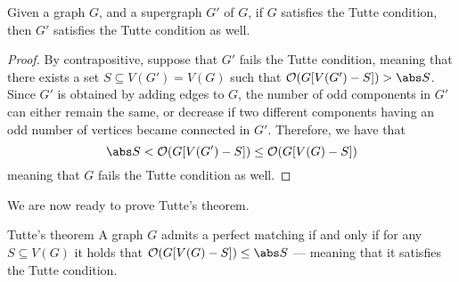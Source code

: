 \documentclass[a4paper, 12pt]{report}
\begin{document}
    \begin{framedlem}{}
        Given a graph $G$, and a supergraph $G'$ of $G$, if $G$ satisfies the Tutte condition, then $G'$ satisfies the Tutte condition as well.
    \end{framedlem}

    \begin{proof}
        By contrapositive, suppose that $G'$ fails the Tutte condition, meaning that there exists a set $S \subseteq V(G') = V(G)$ such that $\mathcal O (G[V(G') - S]) > \abs S$. Since $G'$ is obtained by adding edges to $G$, the number of odd components in $G'$ can either remain the same, or decrease if two different components having an odd number of vertices became connected in $G'$. Therefore, we have that $$\abs S < \mathcal O (G[V(G') - S]) \le \mathcal O (G[V(G) - S])$$ meaning that $G$ fails the Tutte condition as well.
    \end{proof}

    We are now ready to prove Tutte's theorem.

    \begin{framedthm}{Tutte's theorem}
        A graph $G$ admits a perfect matching if and only if for any $S \subseteq V(G)$ it holds that $\mathcal O(G[V(G) - S]) \le \abs S$ --- meaning that it satisfies the Tutte condition.
    \end{framedthm}
\end{document}
